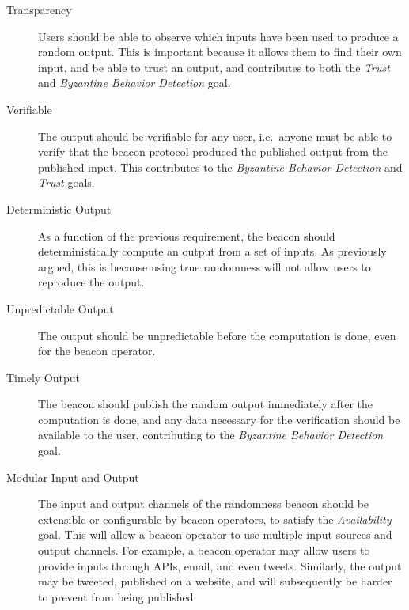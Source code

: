 \begin{description}
    \item [Transparency]
Users should be able to observe which inputs have been used to produce a random output. This is important because it allows them to find their own input, and be able to trust an output, and contributes to both the \emph{Trust} and \emph{Byzantine Behavior Detection} goal.

    \item[Verifiable]
The output should be verifiable for any user, i.e.\ anyone must be able to verify that the beacon protocol produced the published output from the published input. This contributes to the \emph{Byzantine Behavior Detection} and \emph{Trust} goals.

    \item[Deterministic Output]
As a function of the previous requirement, the beacon should deterministically compute an output from a set of inputs.
As previously argued, this is because using true randomness will not allow users to reproduce the output.

    \item[Unpredictable Output]
The output should be unpredictable before the computation is done, even for the beacon operator.

    \item[Timely Output]
The beacon should publish the random output immediately after the computation is done, and any data necessary for the verification should be available to the user, contributing to the \emph{Byzantine Behavior Detection} goal.

    \item[Modular Input and Output]
The input and output channels of the randomness beacon should be extensible or configurable by beacon operators, to satisfy the \emph{Availability} goal.
This will allow a beacon operator to use multiple input sources and output channels.
For example, a beacon operator may allow users to provide inputs through APIs, email, and even tweets.
Similarly, the output may be tweeted, published on a website, and will subsequently be harder to prevent from being published.






\end{description}
